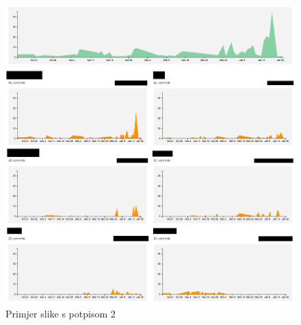 		\begin{figure}[H]
			\includegraphics[width=\linewidth]{slike/aktivnost.PNG}
			\caption{Primjer slike s potpisom 2}
			\label{fig:promjene2}
		\end{figure}
		
		
		
		\eject
		
	